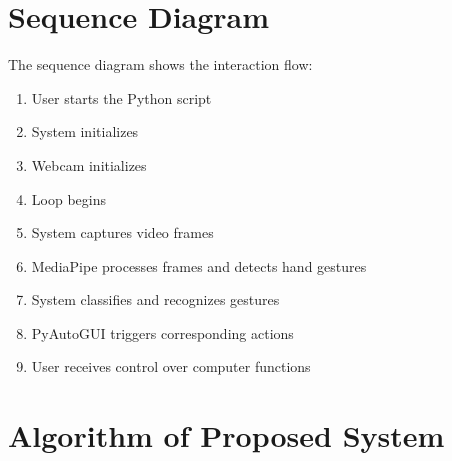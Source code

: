 \documentclass[12pt,a4paper]{report}
\begin{document}
\section{Sequence Diagram}

The sequence diagram shows the interaction flow:

\begin{enumerate}[noitemsep]
  \item User starts the Python script
  \item System initializes
  \item Webcam initializes
  \item Loop begins
  \item System captures video frames
  \item MediaPipe processes frames and detects hand gestures
  \item System classifies and recognizes gestures
  \item PyAutoGUI triggers corresponding actions
  \item User receives control over computer functions
\end{enumerate}

\section{Algorithm of Proposed System}
\end{document}
